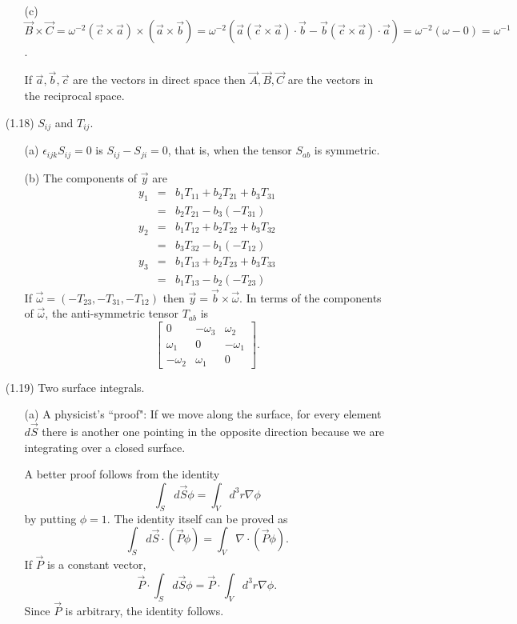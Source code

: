 \documentclass{article}
\begin{document}
\begin{enumerate}
\begin{enumerate}
\item[(c)] $\vec{B} \times \vec{C} = \omega^{-2}(\vec{c} \times \vec{a}) \times
(\vec{a} \times \vec{b}) = \omega^{-2}(\vec{a}(\vec{c} \times \vec{a})\cdot\vec{b} -
\vec{b}(\vec{c} \times \vec{a})\cdot\vec{a}) = \omega^{-2}(\omega - 0) = 
\omega^{-1}$.

If $\vec{a}, \vec{b}, \vec{c}$ are the vectors in direct space then $\vec{A},
\vec{B}, \vec{C}$ are the vectors in the reciprocal space.
\end{enumerate}

\item[(1.18)] $S_{ij}$ and $T_{ij}$.
\begin{enumerate}
\item[(a)] $\epsilon_{ijk}S_{ij} = 0$ is $S_{ij} - S_{ji} = 0$, that is, when the
tensor $S_{ab}$ is symmetric.
\item[(b)] The components of $\vec{y}$ are
\begin{eqnarray*}
y_1 &=& b_1T_{11} + b_2T_{21} + b_3T_{31} \\
    &=& b_2T_{21} - b_3(-T_{31}) \\
y_2 &=& b_1T_{12} + b_2T_{22} + b_3T_{32} \\
    &=& b_3T_{32} - b_1(-T_{12}) \\
y_3 &=& b_1T_{13} + b_2T_{23} + b_3T_{33} \\
    &=& b_1T_{13} - b_2(-T_{23})
\end{eqnarray*}
If $\vec{\omega} = (-T_{23}, -T_{31}, -T_{12})$ then $\vec{y} = \vec{b} \times 
\vec{\omega}$. In terms of the components of $\vec{\omega}$, the anti-symmetric
tensor $T_{ab}$ is
\[
\begin{bmatrix}
0 & -\omega_3 & \omega_2 \\
\omega_1 & 0 & -\omega_1 \\
-\omega_2 & \omega_1 & 0
\end{bmatrix}.
\]
\end{enumerate}

\item[(1.19)] Two surface integrals.
\begin{enumerate}
\item[(a)] A physicist's ``proof": If we move along the surface, for every 
element $d\vec{S}$ there is another one pointing in the opposite direction 
because we are integrating over a closed surface.

A better proof follows from the identity
\[
\int_S d\vec{S}\phi = \int_V d^3r\nabla\phi
\]
by putting $\phi = 1$. The identity itself can be proved as
\[
\int_S d\vec{S}\cdot(\vec{P}\phi) = \int_V \nabla\cdot(\vec{P}\phi).
\]
If $\vec{P}$ is a constant vector,
\[
\vec{P}\cdot \int_S d\vec{S}\phi  = \vec{P}\cdot\int_V d^3r\nabla\phi.
\]
Since $\vec{P}$ is arbitrary, the identity follows.


\end{enumerate}
\end{enumerate}
\end{document}
